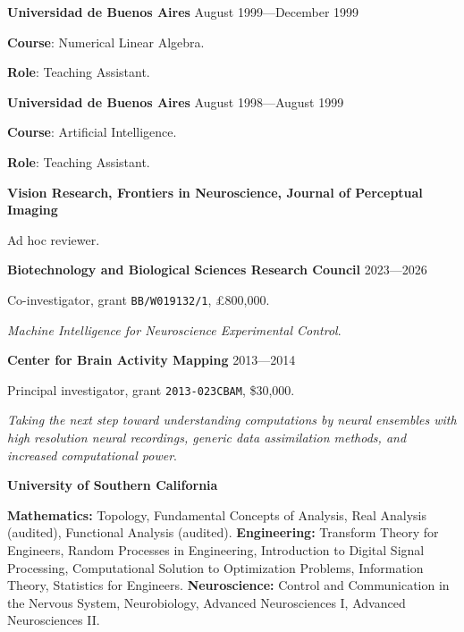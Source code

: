 \documentclass{article}
\begin{document}
\par
\vspace{.1in}
{\bf Universidad de Buenos Aires} \hspace*{\fill} August 1999---December 1999
\par
{\bf Course}: Numerical Linear Algebra.
\par
{\bf Role}: Teaching Assistant.

\par
\vspace{.1in}
{\bf Universidad de Buenos Aires} \hspace*{\fill} August 1998---August 1999
\par
{\bf Course}: Artificial Intelligence.
\par
{\bf Role}: Teaching Assistant.

\par
\vspace{2\baselineskip}
{\bf Vision Research, Frontiers in Neuroscience, Journal of Perceptual Imaging}
\par
Ad hoc reviewer.
\par

\par
\vspace{2\baselineskip}
{\bf Biotechnology and Biological Sciences Research Council}  \hspace*{\fill} 2023---2026
\par
Co-investigator, grant \texttt{BB/W019132/1}, £800,000.
\par
\emph{Machine Intelligence for Neuroscience Experimental Control}.

\par
\vspace{.1in}
{\bf Center for Brain Activity Mapping}  \hspace*{\fill} 2013---2014
\par
Principal investigator, grant \texttt{2013-023CBAM}, \$30,000.
\par
\emph{Taking the next step toward understanding computations by neural
ensembles with high resolution neural recordings, generic data assimilation
methods, and increased computational power}.

\par
\vspace{2\baselineskip}
{\bf University of Southern California}
\par
{}
{\bf Mathematics:} Topology, Fundamental Concepts of Analysis, Real Analysis (audited), Functional Analysis (audited). {\bf Engineering:} Transform Theory for Engineers, Random Processes in Engineering, Introduction to Digital Signal Processing, Computational Solution to Optimization Problems, Information Theory, Statistics for Engineers. {\bf Neuroscience:} Control and Communication in the Nervous System, Neurobiology, Advanced Neurosciences I, Advanced Neurosciences II.\par
\par
\end{document}
